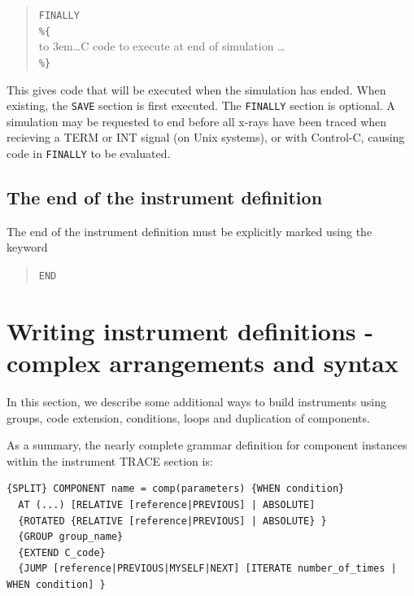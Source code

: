 \begin{quote}
  \texttt{FINALLY} \\
  \verb|%{| \\
  \hbox to 3em{}\ldots C code to execute at end of simulation \ldots \\
  \verb|%}|
\end{quote}
This gives code that will be executed when the simulation has
ended. When existing, the \texttt{SAVE} section is first executed. The
\texttt{FINALLY} section is optional.
A simulation may be requested to end before all x-rays have been
traced when recieving a TERM or INT signal (on Unix systems), or with
Control-C, causing code in \texttt{FINALLY} to be evaluated.
 


\subsection{The end of the instrument definition}
\label{s:end}

The end of the instrument definition must be explicitly marked using the keyword
\begin{quote}
  \texttt{END}
\end{quote}




\section{Writing instrument definitions - complex arrangements and syntax}
\label{s:instrdefs-extend}

In this section, we describe some additional ways to build instruments using groups, code extension, conditions, loops and duplication of components.

As a summary, the nearly complete grammar definition for component instances within the instrument TRACE section is:

\begin{verbatim}
{SPLIT} COMPONENT name = comp(parameters) {WHEN condition}
  AT (...) [RELATIVE [reference|PREVIOUS] | ABSOLUTE]
  {ROTATED {RELATIVE [reference|PREVIOUS] | ABSOLUTE} }
  {GROUP group_name}
  {EXTEND C_code}
  {JUMP [reference|PREVIOUS|MYSELF|NEXT] [ITERATE number_of_times | WHEN condition] }
\end{verbatim}

